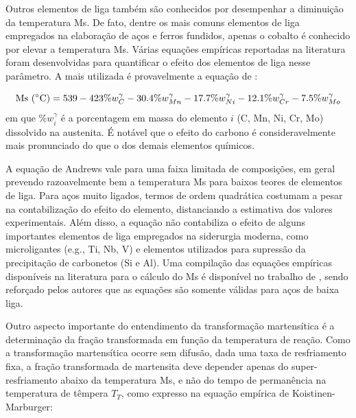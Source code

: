 Outros elementos de liga também são conhecidos por desempenhar a diminuição da temperatura Ms. De fato, dentre os mais comuns elementos de liga empregados na elaboração de  aços e ferros fundidos, apenas o cobalto é conhecido por elevar a temperatura Ms\cite{Honeycombe2006}. Várias equações empíricas reportadas na literatura foram desenvolvidas para quantificar o efeito dos elementos de liga nesse parâmetro. A mais utilizada é provavelmente a equação de :

\begin{equation}
  \text{Ms (\SI{}{\degreeCelsius})} = 539 - 423\%w_C^\gamma - \SI{30.4}{}\%w_{Mn}^\gamma - \SI{17.7}{}\%w_{Ni}^\gamma - \SI{12.1}{}\%w_{Cr}^\gamma - \SI{7.5}{}\%w_{Mo}^\gamma
  \label{eq:Andrews}
\end{equation}
%
em que $\%w_i^\gamma$ é a porcentagem em massa do elemento $i$ (C, Mn, Ni, Cr, Mo) dissolvido na austenita. É notável que o efeito do carbono é consideravelmente mais pronunciado do que o dos demais elementos químicos.

A equação de Andrews vale para uma faixa limitada de composições, em geral prevendo razoavelmente bem a temperatura Ms para baixos teores de elementos de liga. Para aços muito ligados, termos de ordem quadrática costumam a pesar na contabilização do efeito do elemento, distanciando a estimativa dos valores experimentais. Além disso, a equação não contabiliza o efeito de alguns importantes elementos de liga empregados na siderurgia moderna, como microligantes (e.g., Ti, Nb, V) e elementos utilizados para supressão da precipitação de carbonetos (Si e Al). Uma compilação das equações empíricas disponíveis na literatura para o cálculo do Ms é disponível no trabalho de , sendo reforçado pelos autores que as equações são somente válidas para aços de baixa liga.

Outro aspecto importante do entendimento da transformação martensítica é a determinação da fração transformada em função da temperatura de reação. Como a transformação martensítica ocorre sem difusão, dada uma taxa de resfriamento fixa, a fração transformada de martensita deve depender apenas do super-resfriamento abaixo da temperatura Ms, e não do tempo de permanência na temperatura de têmpera $T_T$, como expresso na equação empírica de Koistinen-Marburger\cite{Koistinen1959}:

